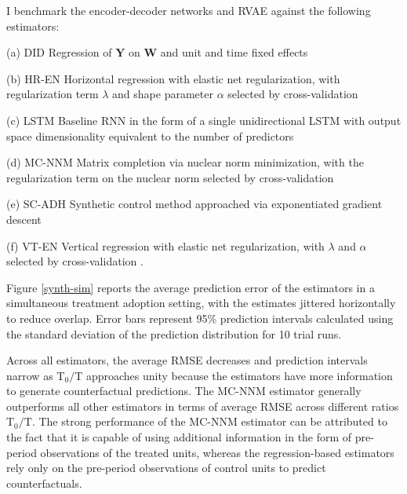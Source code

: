 \documentclass[hidelinks,12pt]{article}
\begin{document}
I benchmark the encoder-decoder networks and RVAE against the following estimators: %

\begin{description}
	\begin{singlespace}
		{\setlength\itemindent{1mm}
			\item[(a) DID] Regression of $\textbf{Y}$ on $\textbf{W}$ and unit and time fixed effects \citep{athey2017matrix}
			\item[(b) HR-EN] Horizontal regression with elastic net regularization, with regularization term $\lambda$ and shape parameter $\alpha$ selected by cross-validation  \citep{athey2017matrix} 
			\item[(c) LSTM] Baseline RNN in the form of a single unidirectional LSTM with output space dimensionality equivalent to the number of predictors
			\item[(d) MC-NNM] Matrix completion via nuclear norm minimization, with the regularization term on the nuclear norm selected by cross-validation \citep{athey2017matrix}
			\item[(e) SC-ADH] Synthetic control method approached via exponentiated gradient descent \citep{abadie2010synthetic}
			\item[(f) VT-EN] Vertical regression with elastic net regularization, with $\lambda$ and $\alpha$ selected by cross-validation \citep{athey2017matrix}.
		}
	\end{singlespace}
\end{description}

Figure \ref{synth-sim} reports the average prediction error of the estimators in a simultaneous treatment adoption setting, with the estimates jittered horizontally to reduce overlap. Error bars represent 95\% prediction intervals calculated using the standard deviation of the prediction distribution for 10 trial runs. 

Across all estimators, the average RMSE decreases and prediction intervals narrow as $\text{T}_0/\text{T}$ approaches unity because the estimators have more information to generate counterfactual predictions. The MC-NNM estimator generally outperforms all other estimators in terms of average RMSE across different ratios $\text{T}_0/\text{T}$.  The strong performance of the MC-NNM estimator can be attributed to the fact that it is capable of using additional information in the form of pre-period observations of the treated units, whereas the regression-based estimators rely only on the pre-period observations of control units to predict counterfactuals. 
\end{document}
